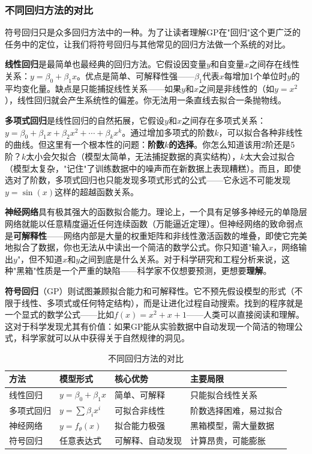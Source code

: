 \documentclass[lang=cn,zihao=-4,a4paper,fontset=windows]{beautybook}
\begin{document}
\subsubsection{不同回归方法的对比}

符号回归只是众多回归方法中的一种。为了让读者理解GP在"回归"这个更广泛的任务中的定位，让我们将符号回归与其他常见的回归方法做一个系统的对比。

\textbf{线性回归}是最简单也最经典的回归方法。它假设因变量$y$和自变量$x$之间存在线性关系：$y = \beta_0 + \beta_1 x$。优点是简单、可解释性强——$\beta_1$代表$x$每增加1个单位时$y$的平均变化量。缺点是只能捕捉线性关系——如果$y$和$x$之间是非线性的（如$y = x^2$），线性回归就会产生系统性的偏差。你无法用一条直线去拟合一条抛物线。

\textbf{多项式回归}是线性回归的自然拓展，它假设$y$和$x$之间存在多项式关系：$y = \beta_0 + \beta_1 x + \beta_2 x^2 + \cdots + \beta_k x^k$。通过增加多项式的阶数$k$，可以拟合各种非线性的曲线。但这里有一个根本性的问题：\textbf{阶数$k$的选择}。你怎么知道该用2阶还是5阶？$k$太小会欠拟合（模型太简单，无法捕捉数据的真实结构），$k$太大会过拟合（模型太复杂，"记住"了训练数据中的噪声而在新数据上表现糟糕）。而且，即使选对了阶数，多项式回归也只能发现多项式形式的公式——它永远不可能发现$y = \sin(x)$这样的超越函数关系。

\textbf{神经网络}具有极其强大的函数拟合能力。理论上，一个具有足够多神经元的单隐层网络就能以任意精度逼近任何连续函数（万能逼近定理）。但神经网络的致命弱点是\textbf{可解释性}——网络内部是大量的权重矩阵和非线性激活函数的堆叠，即使它完美地拟合了数据，你也无法从中读出一个简洁的数学公式。你只知道"输入$x$，网络输出$y$"，但不知道$x$和$y$之间到底是什么关系。对于科学研究和工程分析来说，这种"黑箱"性质是一个严重的缺陷——科学家不仅想要预测，更想要\textbf{理解}。

\textbf{符号回归}（GP）则试图兼顾拟合能力和可解释性。它不预先假设模型的形式（不限于线性、多项式或任何特定结构），而是让进化过程自动搜索。找到的程序就是一个显式的数学公式——比如$f(x) = x^2 + x + 1$——人类可以直接阅读和理解。这对于科学发现尤其有价值：如果GP能从实验数据中自动发现一个简洁的物理公式，科学家就可以从中获得关于自然规律的洞见。

\begin{table}[H]
\centering
\caption{不同回归方法的对比}
\begin{tabular}{p{}p{}p{}p{}}
\toprule
\textbf{方法} & \textbf{模型形式} & \textbf{核心优势} & \textbf{主要局限} \\
\midrule
线性回归 & $y = \beta_0 + \beta_1 x$ & 简单、可解释 & 只能拟合线性关系 \\
\hline
多项式回归 & $y = \sum \beta_i x^i$ & 可拟合非线性 & 阶数选择困难，易过拟合 \\
\hline
神经网络 & $y = f_\theta(x)$ & 拟合能力极强 & 黑箱模型，需大量数据 \\
\hline
符号回归 & 任意表达式 & 可解释、自动发现 & 计算昂贵，可能膨胀 \\
\bottomrule
\end{tabular}
\end{table}
\end{document}
